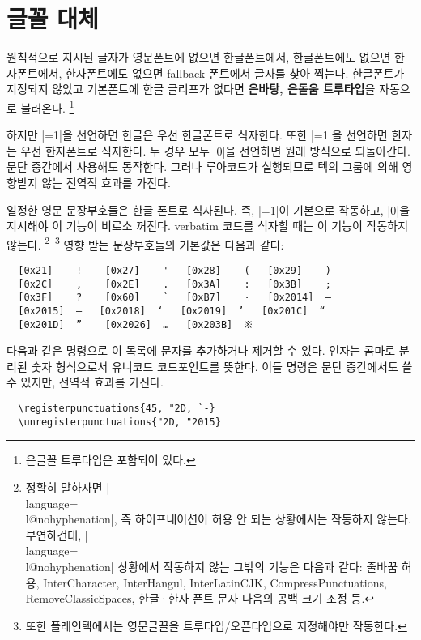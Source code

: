 \documentclass[a4paper]{article}
\def\luatex{\hologo{LuaTeX}}
\def\logoko{\textsf{k}\kern-.0625em\textit{o}}
\def\luatexko{\luatex-\logoko}
\def\texlive{\TeX\ Live}
\def\hemph#1{\textsf{\bfseries #1}}
\begin{document}
\section{글꼴 대체}\label{sec:fontswitch}

원칙적으로  지시된 글자가 영문폰트에 없으면 한글폰트에서,
한글폰트에도 없으면 한자폰트에서, 한자폰트에도 없으면 fallback
폰트에서 글자를 찾아 찍는다.
한글폰트가 지정되지 않았고 기본폰트에 한글 글리프가 없다면
\hemph{은바탕, 은돋움 트루타입}을 자동으로 불러온다.%
\footnote{%
  은글꼴 트루타입은  포함되어 있다. }

하지만 \pkgkwd{\hangulbyhangulfont}|=1|을 선언하면 한글은 우선 한글폰트로
식자한다. 또한 \pkgkwd{\hanjabyhanjafont}|=1|을 선언하면 한자는 우선 한자폰트로
식자한다. 두 경우 모두 |0|을 선언하면 원래 방식으로 되돌아간다.
문단 중간에서 사용해도 동작한다. 그러나 루아코드가 실행되므로
텍의 그룹에 의해 영향받지 않는 전역적 효과를 가진다.

일정한 영문 문장부호들은 한글 폰트로 식자된다.
즉, \pkgkwd{\hangulpunctuations}|=1|이 기본으로 작동하고,
|0|을 지시해야 이 기능이 비로소 꺼진다.
verbatim 코드를 식자할 때는 이 기능이 작동하지 않는다.%
\footnote{%
  정확히 말하자면 |\\language=\\l@nohyphenation|, 즉 하이프네이션이
  허용 안 되는  상황에서는 작동하지 않는다.
  부연하건대, |\\language=\\l@nohyphenation| 상황에서 작동하지 않는
  그밖의 기능은 다음과 같다: 줄바꿈 허용, InterCharacter, InterHangul,
  InterLatinCJK, CompressPunctuations, RemoveClassicSpaces,
  한글^^b7한자 폰트 문자 다음의 공백 크기 조정 등. }\,%
\footnote{%
  또한 플레인텍에서는 영문글꼴을 트루타입/오픈타입으로 지정해야만 작동한다. }
영향 받는 문장부호들의 기본값은 다음과 같다:
\begin{verbatim}
  [0x21]    !    [0x27]    '   [0x28]    (   [0x29]    )
  [0x2C]    ,    [0x2E]    .   [0x3A]    :   [0x3B]    ;
  [0x3F]    ?    [0x60]    `   [0xB7]    ·   [0x2014]  —
  [0x2015]  ―   [0x2018]  ‘   [0x2019]  ’   [0x201C]  “
  [0x201D]  ”    [0x2026]  …   [0x203B]  ※
\end{verbatim}

다음과 같은 명령으로 이 목록에 문자를 추가하거나 제거할 수 있다.
인자는 콤마로 분리된 숫자 형식으로서 유니코드 코드포인트를 뜻한다.
이들 명령은 문단 중간에서도 쓸 수 있지만, 전역적 효과를 가진다.%
\pkgkwd*{\registerpunctuations}%
\pkgkwd*{\unregisterpunctuations}
\begin{verbatim}
  \registerpunctuations{45, "2D, `-}
  \unregisterpunctuations{"2D, "2015}
\end{verbatim}
\end{document}
